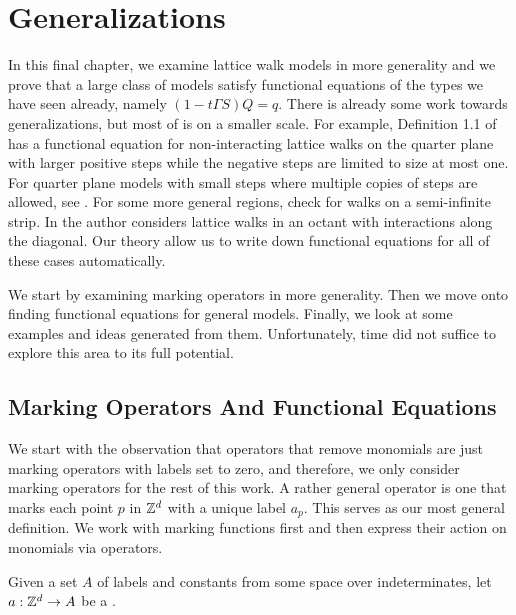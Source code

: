 
\chapter{Generalizations}
\label{ch:General}
In this final chapter, we examine lattice walk models in more generality and we prove that a large class of models satisfy functional equations of the types we have seen already, namely $(1-t\Gamma S)Q = q$. There is already some work towards generalizations, but most of is on a smaller scale. For example, Definition 1.1 of \cite[p.~2]{mishna2009classifying} has a functional equation for non-interacting lattice walks on the quarter plane with larger positive steps while the negative steps are limited to size at most one. For quarter plane models with small steps where multiple copies of steps are allowed, see \cite{kauers2014walks}. For some more general regions, check \cite{brak2005directed, wong2014confining, owczarek2012enumeration} for walks on a semi-infinite strip. In \cite{niederhausen2005note} the author considers lattice walks in an octant with interactions along the diagonal. Our theory allow us to write down functional equations for all of these cases automatically.

We start by examining marking operators in more generality. Then we move onto finding functional equations for general models. Finally, we look at some examples and ideas generated from them. Unfortunately, time did not suffice to explore this area to its full potential.

\section{Marking Operators And Functional Equations}

We start with the observation that operators that remove monomials are just marking operators with labels set to zero, and therefore, we only consider marking operators for the rest of this work. A rather general operator is one that marks each point $p$ in $\mathbb{Z}^d$ with a unique label $a_p$. This serves as our most general definition. We work with marking functions first and then express their action on monomials via operators.

\begin{defn} Given a set $A$ of labels and constants from some space over indeterminates, let $a : \mathbb{Z}^d \to A$ be a .
\end{defn}

